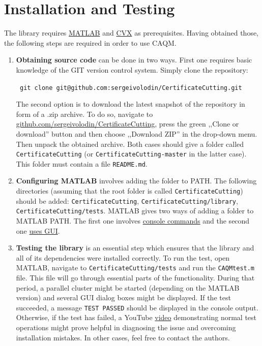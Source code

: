 \documentclass[a4paper]{article}
\theoremstyle{definition}
\begin{document}
\section*{Installation and Testing}
The library requires \href{https://www.mathworks.com/downloads/}{MATLAB} and \href{http://cvxr.com/cvx/download/}{CVX} as prerequisites. Having obtained those, the following steps are required in order to use CAQM.
\begin{enumerate}
\item {\bf Obtaining source code} can be done in two ways. First one requires basic knowledge of the GIT version control system. Simply clone the repository:
\begin{center}\tt
git clone git@github.com:sergeivolodin/CertificateCutting.git
\end{center}
The second option is to download the latest snapshot of the repository in form of a .zip archive. To do so, navigate to \href{https://github.com/sergeivolodin/CertificateCutting}{github.com/sergeivolodin/CertificateCutting}, press the green ,,Clone or download'' button and then choose ,,Download ZIP'' in the drop-down menu. Then unpack the obtained archive. Both cases should give a folder called {\tt CertificateCutting} (or {\tt CertificateCutting-master} in the latter case). This folder must contain a file {\tt README.md}.
\item {\bf Configuring MATLAB} involves adding the folder to PATH. The following directories (assuming that the root folder is called {\tt CertificateCutting}) should be added: {\tt CertificateCutting}, {\tt CertificateCutting/library}, {\tt CertificateCutting/tests}. MATLAB gives two ways of adding a folder to MATLAB PATH. The first one involves \href{https://www.mathworks.com/help/matlab/ref/addpath.html}{console commands} and the second one \href{http://www.mathworks.com/help/matlab/ref/pathtool.html}{uses GUI}.
\item {\bf Testing the library} is an essential step which ensures that the library and all of its dependencies were installed correctly. To run the test, open MATLAB, navigate to {\tt CertificateCutting/tests} and run the {\tt CAQMtest.m} file. This file will go through essential parts of the functionality. During that period, a parallel cluster might be started (depending on the MATLAB version) and several GUI dialog boxes might be displayed. If the test succeeded, a message {\tt TEST PASSED} should be displayed in the console output. Otherwise, if the test has failed, a YouTube \href{https://youtu.be/Ikh_GDHnu-4}{video} demonstrating normal test operations might prove helpful in diagnosing the issue and overcoming installation mistakes. In other cases, feel free to contact the authors.
\end{enumerate}
\end{document}
